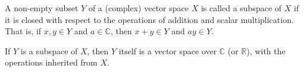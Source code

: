 A non-empty subset $Y$ of a (complex) vector space $X$ is called a subspace of $X$ if it is closed with respect to the operations of addition and scalar multiplication. That is, if $x, y \in Y$ and $a \in \mathbb{C}$, then $x + y \in Y$ and $ay \in Y$.

If $Y$ is a subspace of $X$, then $Y$ itself is a vector space over $\mathbb{C}$ (or $\mathbb{R}$), with the operations inherited from $X$.
